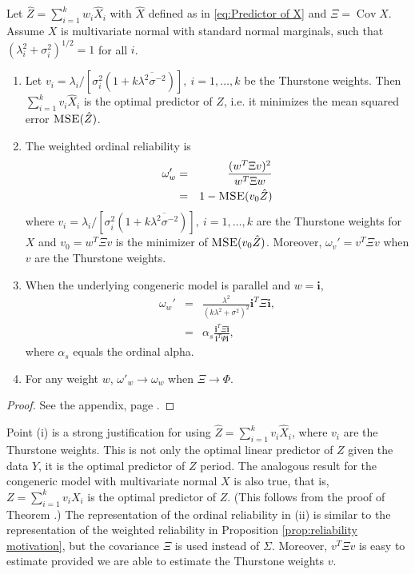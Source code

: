 \documentclass[twoside]{article}
\DeclareMathOperator{\Cov}{Cov}
\DeclareMathOperator{\MSE}{\textsc{MSE}}
\renewcommand{\sqrt}[1]{{(#1)^{1/2}}}
\begin{document}
\begin{thm}
\label{thm:omega-prime}Let $\hat{Z}=\sum_{i=1}^{k}w_{i}\hat{X}_{i}$
with $\hat{X}$ defined as in \eqref{eq:Predictor of X} and $\Xi=\Cov\hat{X}$.
Assume $X$ is multivariate normal with standard normal marginals,
such that $\sqrt{\lambda_{i}^{2}+\sigma_{i}^{2}}=1$ for all $i$.
\begin{enumerate}[label=(\roman*)]
\item Let  $v_{i}=\lambda_{i}/[\sigma_{i}^{2}(1+k\overline{\lambda^{2}\sigma^{-2}})],\:i=1,\ldots,k$ be the Thurstone weights. Then $\sum_{i=1}^{k}v_{i}\hat{X}_{i}$
is the optimal predictor of $Z$, i.e. it minimizes the mean squared
error $\MSE(\hat{Z})$.
\item The weighted ordinal reliability is
\begin{eqnarray}
\omega_{w}' & = & \frac{(w^{T}\Xi v)^{2}}{w^{T}\Xi w}\label{eq:Omega prime}\\
 & = & 1-\MSE(v_{0}\hat{Z})\nonumber 
\end{eqnarray}
where $v_{i}=\lambda_{i}/[\sigma_{i}^{2}(1+k\overline{\lambda^{2}\sigma^{-2}})],\:i=1,\ldots,k$
are the Thurstone weights for $X$ and $v_{0}=w^{T}\Xi v$ is the
minimizer of $\MSE(v_{0}\hat{Z})$. Moreover, $\omega_{v}'=v^{T}\Xi v$ when $v$
are the Thurstone weights.
\item When the underlying congeneric model is parallel and $w=\mathbf{i}$,
\begin{eqnarray}
\omega_{w}' & = & \frac{\lambda^{2}}{\left(k\lambda^{2}+\sigma^{2}\right)^{2}}\mathbf{i}^{T}\Xi\mathbf{i},\label{eq:Alpha prime}\\
 & = & \alpha_{s}\frac{\mathbf{i}^{T}\Xi\mathbf{i}}{\mathbf{i}^{T}\Psi\mathbf{i}},\nonumber 
\end{eqnarray}
where $\alpha_{s}$ equals the ordinal alpha.
\item For any weight $w$, $\omega'_{w}\to\omega_{w}$ when $\Xi\to\Phi$. 
\end{enumerate}
\end{thm}

\begin{proof}
See the appendix, page \pageref{proof:omega-prime}.
\end{proof}
Point (i) is a strong justification for using $\hat{Z}=\sum_{i=1}^{k}v_{i}\hat{X}_{i}$,
where $v_{i}$ are the Thurstone weights. This is not only the optimal
linear predictor of $Z$ given the data $Y$, it is the optimal predictor
of $Z$ period. The analogous result for the congeneric model with
multivariate normal $X$ is also true, that is, $Z=\sum_{i=1}^{k}v_{i}X_{i}$
is the optimal predictor of $Z$. (This follows from the proof of
Theorem \pageref{thm:omega-prime}.) The representation of the ordinal
reliability in (ii) is similar to the representation of the weighted
reliability in Proposition \ref{prop:reliability motivation}, but the covariance $\Xi$ is used
instead of $\Sigma$. Moreover, $v^{T}\Xi v$ is easy to estimate
provided we are able to estimate the Thurstone weights $v$. 
\end{document}
